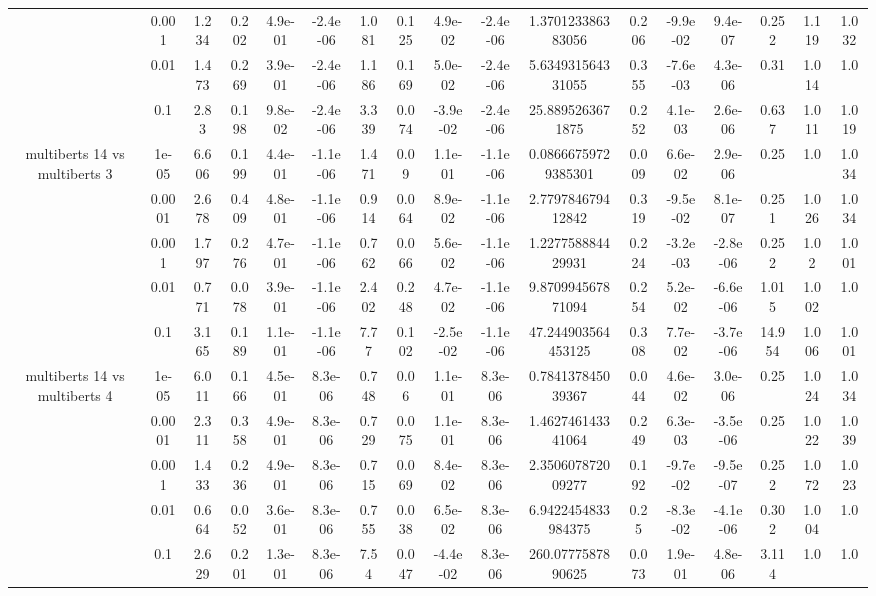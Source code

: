 \begin{tabular}{|c|c|c|c|c|c|c|c|c|c|c|c|c|c|c|c|c|}
 & 0.001 & 1.234 & 0.202 & 4.9e-01 & -2.4e-06 & 1.081 & 0.125 & 4.9e-02 & -2.4e-06 & 1.370123386383056 & 0.206 & -9.9e-02 & 9.4e-07 & 0.252 & 1.119 & 1.032 \\
 & 0.01 & 1.473 & 0.269 & 3.9e-01 & -2.4e-06 & 1.186 & 0.169 & 5.0e-02 & -2.4e-06 & 5.634931564331055 & 0.355 & -7.6e-03 & 4.3e-06 & 0.31 & 1.014 & 1.0 \\
 & 0.1 & 2.83 & 0.198 & 9.8e-02 & -2.4e-06 & 3.339 & 0.074 & -3.9e-02 & -2.4e-06 & 25.8895263671875 & 0.252 & 4.1e-03 & 2.6e-06 & 0.637 & 1.011 & 1.019 \\
\hline
\multirow{5}{*}{multiberts 14 vs multiberts 3} & 1e-05 & 6.606 & 0.199 & 4.4e-01 & -1.1e-06 & 1.471 & 0.09 & 1.1e-01 & -1.1e-06 & 0.08666759729385301 & 0.009 & 6.6e-02 & 2.9e-06 & 0.25 & 1.0 & 1.034 \\
 & 0.0001 & 2.678 & 0.409 & 4.8e-01 & -1.1e-06 & 0.914 & 0.064 & 8.9e-02 & -1.1e-06 & 2.779784679412842 & 0.319 & -9.5e-02 & 8.1e-07 & 0.251 & 1.026 & 1.034 \\
 & 0.001 & 1.797 & 0.276 & 4.7e-01 & -1.1e-06 & 0.762 & 0.066 & 5.6e-02 & -1.1e-06 & 1.227758884429931 & 0.224 & -3.2e-03 & -2.8e-06 & 0.252 & 1.02 & 1.001 \\
 & 0.01 & 0.771 & 0.078 & 3.9e-01 & -1.1e-06 & 2.402 & 0.248 & 4.7e-02 & -1.1e-06 & 9.870994567871094 & 0.254 & 5.2e-02 & -6.6e-06 & 1.015 & 1.002 & 1.0 \\
 & 0.1 & 3.165 & 0.189 & 1.1e-01 & -1.1e-06 & 7.77 & 0.102 & -2.5e-02 & -1.1e-06 & 47.244903564453125 & 0.308 & 7.7e-02 & -3.7e-06 & 14.954 & 1.006 & 1.001 \\
\hline
\multirow{5}{*}{multiberts 14 vs multiberts 4} & 1e-05 & 6.011 & 0.166 & 4.5e-01 & 8.3e-06 & 0.748 & 0.06 & 1.1e-01 & 8.3e-06 & 0.784137845039367 & 0.044 & 4.6e-02 & 3.0e-06 & 0.25 & 1.024 & 1.034 \\
 & 0.0001 & 2.311 & 0.358 & 4.9e-01 & 8.3e-06 & 0.729 & 0.075 & 1.1e-01 & 8.3e-06 & 1.462746143341064 & 0.249 & 6.3e-03 & -3.5e-06 & 0.25 & 1.022 & 1.039 \\
 & 0.001 & 1.433 & 0.236 & 4.9e-01 & 8.3e-06 & 0.715 & 0.069 & 8.4e-02 & 8.3e-06 & 2.350607872009277 & 0.192 & -9.7e-02 & -9.5e-07 & 0.252 & 1.072 & 1.023 \\
 & 0.01 & 0.664 & 0.052 & 3.6e-01 & 8.3e-06 & 0.755 & 0.038 & 6.5e-02 & 8.3e-06 & 6.9422454833984375 & 0.25 & -8.3e-02 & -4.1e-06 & 0.302 & 1.004 & 1.0 \\
 & 0.1 & 2.629 & 0.201 & 1.3e-01 & 8.3e-06 & 7.54 & 0.047 & -4.4e-02 & 8.3e-06 & 260.0777587890625 & 0.073 & 1.9e-01 & 4.8e-06 & 3.114 & 1.0 & 1.0 \\

\end{tabular}
